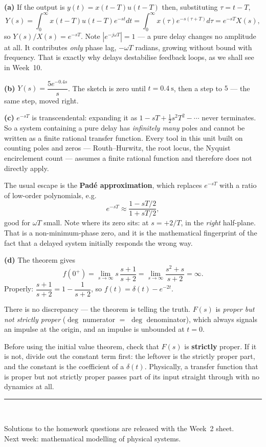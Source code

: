 \documentclass[11pt,a4paper]{article}
\newif\ifsolutions
\begin{document}
\begin{solution}
\textbf{(a)} If the output is $y(t)=x(t-T)u(t-T)$ then, substituting
$\tau=t-T$,
\[
  Y(s)=\int_{0}^{\infty}\!x(t-T)u(t-T)e^{-st}dt
      =\int_{0}^{\infty}\!x(\tau)e^{-s(\tau+T)}d\tau
      =e^{-sT}X(s),
\]
so $Y(s)/X(s)=e^{-sT}$. Note $|e^{-j\omega T}|=1$ --- a pure delay changes no
amplitude at all. It contributes \emph{only} phase lag, $-\omega T$ radians,
growing without bound with frequency. That is exactly why delays destabilise
feedback loops, as we shall see in Week~10.

\medskip
\textbf{(b)} $Y(s)=\dfrac{5e^{-0.4s}}{s}$. The sketch is zero until
$t=\SI{0.4}{\second}$, then a step to $5$ --- the same step, moved right.

\medskip
\textbf{(c)} $e^{-sT}$ is transcendental: expanding it as
$1-sT+\tfrac{1}{2}s^{2}T^{2}-\cdots$ never terminates. So a system containing a
pure delay has \emph{infinitely many} poles and cannot be written as a finite
rational transfer function. Every tool in this unit built on counting poles and
zeros --- Routh--Hurwitz, the root locus, the Nyquist encirclement count ---
assumes a finite rational function and therefore does not directly apply.

The usual escape is the \textbf{Pad\'e approximation}, which replaces
$e^{-sT}$ with a ratio of low-order polynomials, e.g.
\[
  e^{-sT}\approx\frac{1-sT/2}{1+sT/2},
\]
good for $\omega T$ small. Note where its zero sits: at $s=+2/T$, in the
\emph{right} half-plane. That is a non-minimum-phase zero, and it is the
mathematical fingerprint of the fact that a delayed system initially responds
the wrong way.

\medskip
\textbf{(d)} The theorem gives
\[
  f(0^{+})=\lim_{s\to\infty}s\,\frac{s+1}{s+2}=\lim_{s\to\infty}\frac{s^{2}+s}{s+2}
  =\infty .
\]
Properly: $\dfrac{s+1}{s+2}=1-\dfrac{1}{s+2}$, so
$f(t)=\delta(t)-e^{-2t}$.

There is no discrepancy --- the theorem is telling the truth. $F(s)$ is
\emph{proper but not strictly proper} ($\deg$ numerator $=$ $\deg$
denominator), which always signals an impulse at the origin, and an impulse
is unbounded at $t=0$.

\begin{pitfall}
Before using the initial value theorem, check that $F(s)$ is \textbf{strictly}
proper. If it is not, divide out the constant term first: the leftover is the
strictly proper part, and the constant is the coefficient of a $\delta(t)$.
Physically, a transfer function that is proper but not strictly proper passes
part of its input straight through with no dynamics at all.
\end{pitfall}
\end{solution}

\vfill
\begin{center}
\rule{0.5\textwidth}{0.4pt}\\[4pt]
{\small\itshape
\ifsolutions
  End of solutions. Week~2: mathematical modelling of physical systems.
\else
  Solutions to the homework questions are released with the Week~2 sheet.\\
  Next week: mathematical modelling of physical systems.
\fi}
\end{center}
\end{document}
